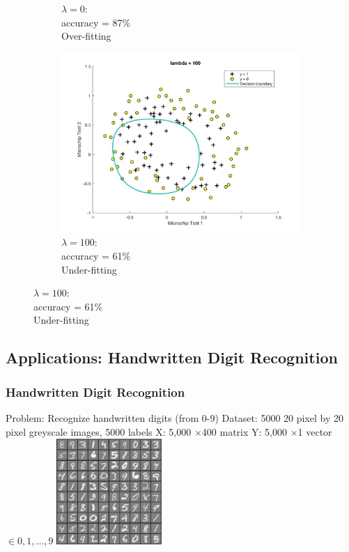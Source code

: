 \begin{frame}
\begin{figure}[h!]
\begin{subfigure}{.3\textwidth}
  \caption{$\lambda=0$:\\ accuracy = 87\% \\ Over-fitting}
  \label{fig:sub2}
\end{subfigure}
\begin{subfigure}{.3\textwidth}
  \centering
  \includegraphics[scale = 0.1]{pictures/6_plotData2_lambda_100_underfitting}
  \caption{$\lambda=100$:\\ accuracy = 61\% \\ Under-fitting}
  \label{fig:sub2}
\end{subfigure}
\end{figure}

\end{frame}

\subsection{Applications: Handwritten Digit Recognition}
\begin{frame}
\frametitle{Handwritten Digit Recognition}
Problem: Recognize handwritten digits (from 0-9)\newline\newline
Dataset: 5000 20 pixel by 20 pixel greyscale images, 5000 labels \newline\newline
X: 5,000 $\times$400 matrix\newline\newline
Y: 5,000 $\times$1 vector $\in {0,1,...,9}$
\includegraphics[width=4cm,keepaspectratio]{pictures/7_digits}
\end{frame}

